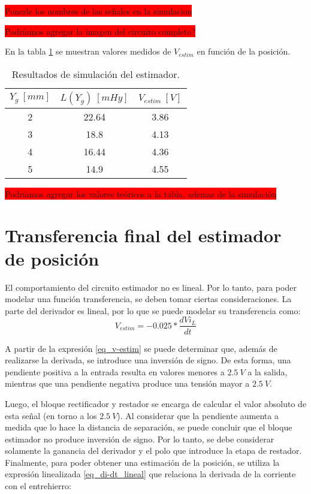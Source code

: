 \colorbox{red}{Ponerle los nombres de las señales en la simulacion}


\colorbox{red}{Podríamos agregar la imagen del circuito completo?}



En la tabla \ref{tab_Resultados_de_simulación_del_estimador} se muestran valores medidos de $V_{estim}$ en función de la posición.


\begin{table}[H]
	\begin{center}
		\begin{tabular}{| c | c | c |}
			\hline
			$Y_g\:[mm]$ & $L(Y_g)\:[mHy]$ & $V_{estim}\:[V]$ \\ \hline 
			2 & 22.64 & 3.86 \\ \hline 
			3 & 18.8 & 4.13 \\ \hline 
			4 & 16.44 & 4.36 \\ \hline 
			5 & 14.9 & 4.55 \\ \hline 
		\end{tabular}
		\caption{Resultados de simulación del estimador.}
		\label{tab_Resultados_de_simulación_del_estimador}
	\end{center}
\end{table}

\colorbox{red}{Podríamos agregar los valores teóricos a la tabla, ademas de la simulación}

\section{Transferencia final del estimador de posición}

El comportamiento del circuito estimador no es lineal.  Por lo tanto, para poder modelar una función transferencia, se deben tomar ciertas consideraciones. La parte del derivador es lineal, por lo que se puede modelar su transferencia como:
\begin{equation}\label{eq_v-estim}
	V_{estim}=-0.025*\frac{dVi_L}{dt} 
\end{equation}

A partir de la expresión \ref{eq_v-estim} se puede determinar que, además de realizarse la derivada, se introduce una inversión de signo. De esta forma, una pendiente positiva a la entrada resulta en valores menores a $2.5\:V$ a la salida, mientras que una pendiente negativa produce una tensión mayor a $2.5\:V$.

Luego, el bloque rectificador y restador se encarga de calcular el valor absoluto de esta señal (en torno a los $2.5\:V$). Al considerar que la pendiente aumenta a medida que lo hace la distancia de separación, se puede concluir que el bloque estimador no produce inversión de signo. Por lo tanto, se debe considerar solamente la ganancia del derivador y el polo que introduce la etapa de restador. Finalmente, para poder obtener una estimación de la posición, se utiliza la expresión linealizada \ref{eq_di-dt_lineal} que relaciona la derivada de la corriente con el entrehierro:

